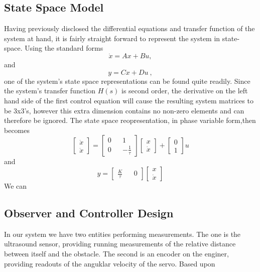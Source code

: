 \documentclass[a4paper,onecolumn,amsmath,amssymb]{revtex4-1}
\begin{document}
\subsection{\textbf{State Space Model}}
Having previously disclosed the differential equations and transfer function of the system at hand, it is fairly straight forward to represent the system in state-space. Using the standard forms 
\begin{equation}
\dot x=Ax+Bu ,
\end{equation}
and
\begin{equation}
y=Cx+Du~,
\end{equation}
one of the system's state space representations can be found quite readily. Since the system's transfer function $H(s)$ is second order, the derivative on the left hand side of the first control equation will cause the resulting  system matrices to be 3x3's, however this extra dimension contains no non-zero elements and can therefore be ignored. The state space reopresentation, in phase variable form,then becomes
\begin{equation}
\begin{bmatrix}
\dot x \\
\ddot x
\end{bmatrix}
=
\begin{bmatrix}
0 && 1 \\
0 && -\frac{1}{\tau}
\end{bmatrix}
\begin{bmatrix}
x \\ \dot x
\end{bmatrix}
+
\begin{bmatrix}
0\\ 1
\end{bmatrix}
u
\end{equation}
and
\begin{equation}
y=
 \begin{bmatrix}
\frac{K}{\tau}&& 0
\end{bmatrix}
\begin{bmatrix}
x \\ \dot x
\end{bmatrix}
\end{equation}
We can
\subsection{\textbf{Observer and Controller Design}}
In our system we have two entities performing measurements. The one is the ultrasound sensor, providing running measurements of the relative distance between itself and the obstacle. The second is an encoder on the enginer, providing readouts of the anguklar velocity of the servo. Based upon
\end{document}
